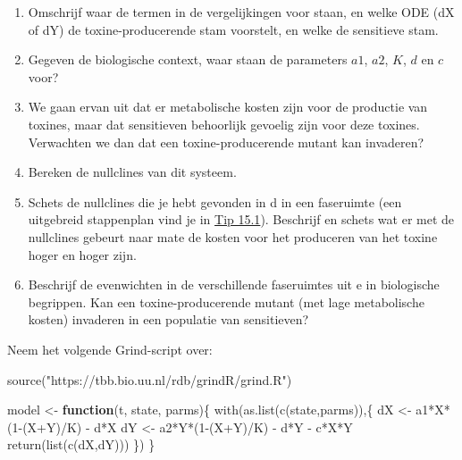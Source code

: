 \documentclass[
  letterpaper,
  DIV=11,
  numbers=noendperiod]{scrartcl}
\newenvironment{Shaded}{\begin{snugshade}}{\end{snugshade}}
\newcommand{\ControlFlowTok}[1]{\textcolor[rgb]{0.00,0.23,0.31}{\textbf{#1}}}
\newcommand{\DecValTok}[1]{\textcolor[rgb]{0.68,0.00,0.00}{#1}}
\newcommand{\FunctionTok}[1]{\textcolor[rgb]{0.28,0.35,0.67}{#1}}
\newcommand{\NormalTok}[1]{\textcolor[rgb]{0.00,0.23,0.31}{#1}}
\newcommand{\OtherTok}[1]{\textcolor[rgb]{0.00,0.23,0.31}{#1}}
\newcommand{\SpecialCharTok}[1]{\textcolor[rgb]{0.37,0.37,0.37}{#1}}
\newcommand{\StringTok}[1]{\textcolor[rgb]{0.13,0.47,0.30}{#1}}
\providecommand{\tightlist}{%
  \setlength{\itemsep}{0pt}\setlength{\parskip}{0pt}}
\begin{document}
\begin{tcolorbox}
\begin{enumerate}
\def\labelenumi{\alph{enumi}.}
\tightlist
\item
  Omschrijf waar de termen in de vergelijkingen voor staan, en welke ODE
  (dX of dY) de toxine-producerende stam voorstelt, en welke de
  sensitieve stam.
\item
  Gegeven de biologische context, waar staan de parameters \(a1\),
  \(a2\), \(K\), \(d\) en \(c\) voor?
\item
  We gaan ervan uit dat er metabolische kosten zijn voor de productie
  van toxines, maar dat sensitieven behoorlijk gevoelig zijn voor deze
  toxines. Verwachten we dan dat een toxine-producerende mutant kan
  invaderen?
\item
  Bereken de nullclines van dit systeem.
\item
  Schets de nullclines die je hebt gevonden in d in een faseruimte (een
  uitgebreid stappenplan vind je in
  \href{competitie.qmd\#tip-odesschetsen}{Tip 15.1}). Beschrijf en
  schets wat er met de nullclines gebeurt naar mate de kosten voor het
  produceren van het toxine hoger en hoger zijn.
\item
  Beschrijf de evenwichten in de verschillende faseruimtes uit e in
  biologische begrippen. Kan een toxine-producerende mutant (met lage
  metabolische kosten) invaderen in een populatie van sensitieven?
\end{enumerate}

Neem het volgende Grind-script over:

\begin{Shaded}
\begin{Highlighting}[]
\FunctionTok{source}\NormalTok{(}\StringTok{"https://tbb.bio.uu.nl/rdb/grindR/grind.R"}\NormalTok{)}

\NormalTok{model }\OtherTok{\textless{}{-}} \ControlFlowTok{function}\NormalTok{(t, state, parms)\{}
  \FunctionTok{with}\NormalTok{(}\FunctionTok{as.list}\NormalTok{(}\FunctionTok{c}\NormalTok{(state,parms)),\{}
\NormalTok{    dX }\OtherTok{\textless{}{-}}\NormalTok{ a1}\SpecialCharTok{*}\NormalTok{X}\SpecialCharTok{*}\NormalTok{(}\DecValTok{1}\SpecialCharTok{{-}}\NormalTok{(X}\SpecialCharTok{+}\NormalTok{Y)}\SpecialCharTok{/}\NormalTok{K) }\SpecialCharTok{{-}}\NormalTok{ d}\SpecialCharTok{*}\NormalTok{X}
\NormalTok{    dY }\OtherTok{\textless{}{-}}\NormalTok{ a2}\SpecialCharTok{*}\NormalTok{Y}\SpecialCharTok{*}\NormalTok{(}\DecValTok{1}\SpecialCharTok{{-}}\NormalTok{(X}\SpecialCharTok{+}\NormalTok{Y)}\SpecialCharTok{/}\NormalTok{K) }\SpecialCharTok{{-}}\NormalTok{ d}\SpecialCharTok{*}\NormalTok{Y }\SpecialCharTok{{-}}\NormalTok{ c}\SpecialCharTok{*}\NormalTok{X}\SpecialCharTok{*}\NormalTok{Y}
    \FunctionTok{return}\NormalTok{(}\FunctionTok{list}\NormalTok{(}\FunctionTok{c}\NormalTok{(dX,dY)))}
\NormalTok{  \})}
\NormalTok{\}  }


\end{Highlighting}
\end{Shaded}
\end{tcolorbox}
\end{document}
